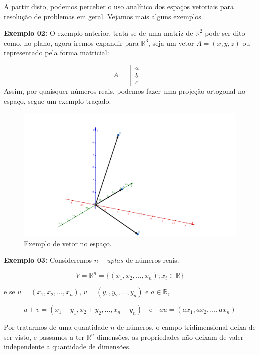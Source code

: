 A partir disto, podemos perceber o uso analítico dos espaços vetoriais para resolução de problemas em geral. Vejamos mais alguns exemplos.

\noindent\textbf{Exemplo 02:} O exemplo anterior, trata-se de uma matriz de $\mathbb{R}^2$ pode ser dito como, no plano, agora iremos expandir para $\mathbb{R}^3$, seja um vetor $A = (x, y, z)$ ou representado pela forma matricial:

\[
A = \begin{bmatrix}
	a \\ b \\ c
\end{bmatrix}
\]
\noindent Assim, por quaisquer números reais, podemos fazer uma projeção ortogonal no espaço, segue um exemplo traçado:

\begin{figure}[H]
	\centering
	\includegraphics[scale=0.30]{exemplo02.png}
	\caption{Exemplo de vetor no espaço.}
\end{figure}

\noindent\textbf{Exemplo 03:} Consideremos $n-uplas$ de números reais.

\begin{equation}
	V = \mathbb{R}^n = \{(x_1, x_2, \ldots, x_n); x_i \in \mathbb{R}\}
\end{equation}

\noindent e se \( u = (x_1, x_2, \ldots, x_n) \), \( v = (y_1, y_2, \ldots, y_n) \) e \( a \in \mathbb{R} \),

\[
u + v = (x_1 + y_1, x_2 + y_2, \ldots, x_n + y_n) \quad \text{e} \quad a u = (ax_1, ax_2, \ldots, ax_n)
\]


Por tratarmos de uma quantidade $n$ de números, o campo tridimensional deixa de ser visto, e passamos a ter $\mathbb{R}^n$ dimensões, as propriedades não deixam de valer independente a quantidade de dimensões.

